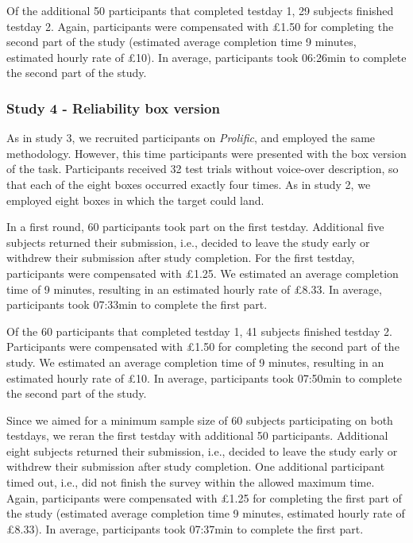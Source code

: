 \documentclass[
  man,floatsintext]{apa6}
\begin{document}
Of the additional 50 participants that completed testday 1, 29 subjects finished testday 2. Again, participants were compensated with £1.50 for completing the second part of the study (estimated average completion time 9 minutes, estimated hourly rate of £10). In average, participants took 06:26min to complete the second part of the study.

\hypertarget{study-4---reliability-box-version}{%
\subsubsection{Study 4 - Reliability box version}\label{study-4---reliability-box-version}}

As in study 3, we recruited participants on \emph{Prolific}, and employed the same methodology. However, this time participants were presented with the box version of the task. Participants received 32 test trials without voice-over description, so that each of the eight boxes occurred exactly four times. As in study 2, we employed eight boxes in which the target could land.

In a first round, 60 participants took part on the first testday. Additional five subjects returned their submission, i.e., decided to leave the study early or withdrew their submission after study completion. For the first testday, participants were compensated with £1.25. We estimated an average completion time of 9 minutes, resulting in an estimated hourly rate of £8.33. In average, participants took 07:33min to complete the first part.

Of the 60 participants that completed testday 1, 41 subjects finished testday 2. Participants were compensated with £1.50 for completing the second part of the study. We estimated an average completion time of 9 minutes, resulting in an estimated hourly rate of £10. In average, participants took 07:50min to complete the second part of the study.

Since we aimed for a minimum sample size of 60 subjects participating on both testdays, we reran the first testday with additional 50 participants. Additional eight subjects returned their submission, i.e., decided to leave the study early or withdrew their submission after study completion. One additional participant timed out, i.e., did not finish the survey within the allowed maximum time. Again, participants were compensated with £1.25 for completing the first part of the study (estimated average completion time 9 minutes, estimated hourly rate of £8.33). In average, participants took 07:37min to complete the first part.
\end{document}
